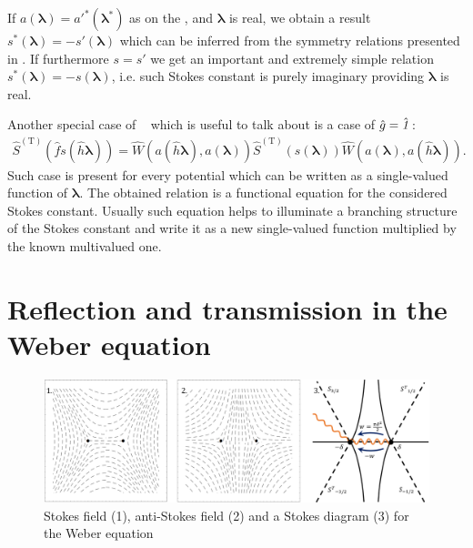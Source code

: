 \documentclass[12pt]{iopart}
\def\S{\hat{S}}
\def\W{\hat{W}}
\def\f{\hat{f}}
\def\g{\hat{g}}
\def\h{\hat{h}}
\def\lmbd{\bm{\lambda}}
\def\T{\mathrm{T}}
\def\unity{\hat{\it 1}}
\begin{document}
If $a(\lmbd)=a'^*(\lmbd^*)$ as on the , and $\lmbd$ is real, we obtain a result 
$s^*(\lmbd)=-s'(\lmbd)$ which can be inferred from the symmetry relations presented in \cite{symm}. 
If furthermore $s=s'$ we get an important and extremely simple relation $s^*(\lmbd)=-s(\lmbd)$, i.e. such Stokes constant is purely imaginary providing $\lmbd$ is real.

Another special case of ~ which is useful to talk about is a case of $\g=\unity$:
\begin{eqnarray}
\S^{(\T)} \left( \f s(\h\lmbd) \right) = 
\W \left( a(\h\lmbd),a(\lmbd) \right)
\S^{(\T)} \left( s(\lmbd) \right)
\W \left( a(\lmbd),a(\h\lmbd) \right).
\label{eq:func}
\end{eqnarray}
Such case is present for every potential which can be written as a single-valued function of $\lmbd$.
The obtained relation is a functional equation for the considered Stokes constant. Usually such equation helps to illuminate a branching structure of the Stokes constant and write it as a new single-valued function multiplied by the known multivalued one.

\section{Reflection and transmission in the Weber equation \label{sec:weber}}

\begin{figure}
\centering
\noindent
\includegraphics[scale=.5]{stuff/wsd.png}
\caption{Stokes field (1), anti-Stokes field (2) and a Stokes diagram (3) for the Weber equation ~}
\label{fig:wsd}
\end{figure} 
\end{document}
